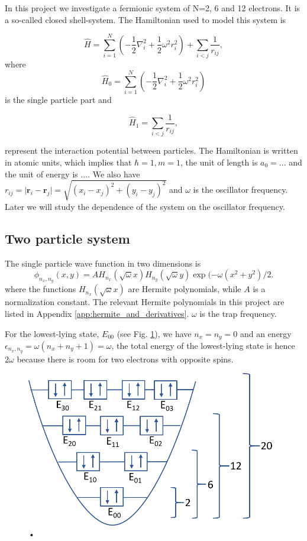 In this project we investigate a fermionic system of N=2, 6 and 12 electrons. It is a so-called closed shell-system. The Hamiltonian used to model this system is

\begin{equation}
\label{eq:finalH}
\hat{H}=\sum_{i=1}^{N} \left(  -\frac{1}{2} \nabla_i^2 + \frac{1}{2} \omega^2r_i^2  \right)+\sum_{i<j}\frac{1}{r_{ij}},
\end{equation}
where 
$$\hat{H}_0=\sum_{i=1}^{N} \left(  -\frac{1}{2} \nabla_i^2 + \frac{1}{2} \omega^2r_i^2  \right)$$
is the single particle part and

\begin{equation}\label{eq:hamilton_interaction}
\hat{H}_1=\sum_{i<j}\frac{1}{r_{ij}},
\end{equation}

represent the interaction potential between particles. The Hamiltonian is written in atomic units, which implies that $\hbar = 1, m= 1$, the unit of length is $a_0 = ...$ and the unit of energy is $...$.  We also have $r_{ij}=\vert \bm{r}_i-\bm{r}_j\vert= \sqrt{(x_i-x_j)^2 + (y_i-y_j)^2}$ and $\omega$ is the oscillator frequency. Later we will study the dependence of the system on the oscillator frequency. 

\subsection{Two particle system}

The single particle wave function in two dimensions is
\begin{equation}\label{eq:single_particle_wf}
\phi_{n_x,n_y}(x,y) = A H_{n_x}(\sqrt{\omega}x)H_{n_y}(\sqrt{\omega}y)\exp{(-\omega(x^2+y^2)/2}.
\end{equation}
where the functions $H_{n_x}(\sqrt{\omega}x)$ are Hermite polynomials,  while $A$ is a normalization constant. The relevant Hermite polynomials in this project are listed in Appendix \ref{app:hermite_and_derivatives}. $\omega$ is the trap frequency.

For the lowest-lying state, $E_{00}$  (see Fig. \ref{fig:states}), we have $n_x=n_y=0$ and an energy $\epsilon_{n_x,n_y}=\omega(n_x+n_y+1) = \omega$, the total energy of the lowest-lying state is hence $2\omega$ because there is room for two electrons with opposite spins. 

\begin{figure}[H]
\center
\includegraphics[width=0.6\linewidth]{../Results/states}\caption{•}\label{fig:states}
\end{figure}

